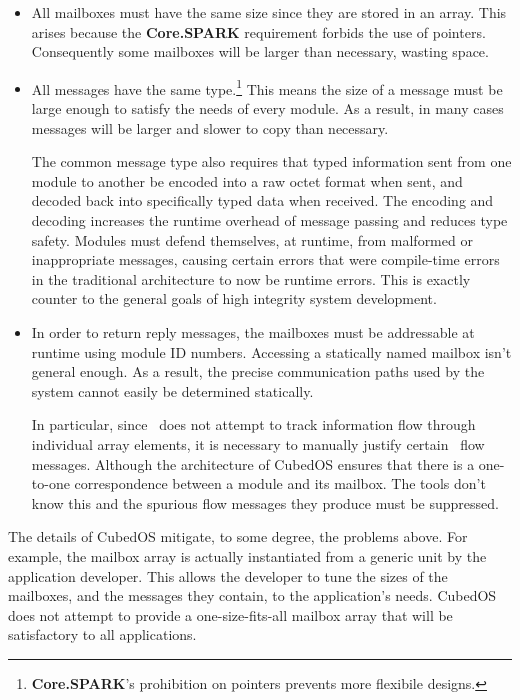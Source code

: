 \begin{itemize}
\item All mailboxes must have the same size since they are stored in an array. This arises
  because the \textbf{Core.SPARK} requirement forbids the use of pointers. Consequently some
  mailboxes will be larger than necessary, wasting space.

\item All messages have the same type.\footnote{\textbf{Core.SPARK}'s prohibition on pointers
    prevents more flexibile designs.} This means the size of a message must be large enough to
  satisfy the needs of every module. As a result, in many cases messages will be larger and
  slower to copy than necessary.

  The common message type also requires that typed information sent from one module to another
  be encoded into a raw octet format when sent, and decoded back into specifically typed data
  when received. The encoding and decoding increases the runtime overhead of message passing and
  reduces type safety. Modules must defend themselves, at runtime, from malformed or
  inappropriate messages, causing certain errors that were compile-time errors in the
  traditional architecture to now be runtime errors. This is exactly counter to the general
  goals of high integrity system development.

\item In order to return reply messages, the mailboxes must be addressable at runtime using
  module ID numbers.  Accessing a statically named mailbox isn't general enough.
  As a result, the precise communication paths used by the system cannot easily be determined
  statically.

  In particular, since \SPARK\ does not attempt to track information flow through individual
  array elements, it is necessary to manually justify certain \SPARK\ flow messages. Although
  the architecture of CubedOS ensures that there is a one-to-one correspondence between a module
  and its mailbox. The tools don't know this and the spurious flow messages they produce must be
  suppressed.
\end{itemize}

The details of CubedOS mitigate, to some degree, the problems above. For example, the mailbox
array is actually instantiated from a generic unit by the application developer. This allows the
developer to tune the sizes of the mailboxes, and the messages they contain, to the
application's needs. CubedOS does not attempt to provide a one-size-fits-all mailbox array that
will be satisfactory to all applications.

